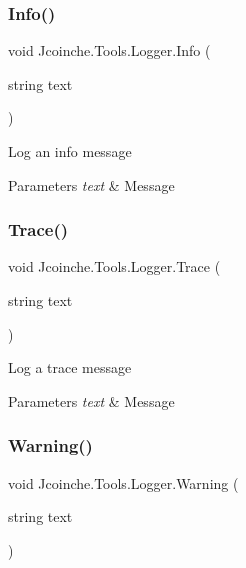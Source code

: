 \subsubsection{\texorpdfstring{Info()}{Info()}}
{\footnotesize\ttfamily void Jcoinche.\+Tools.\+Logger.\+Info (\begin{DoxyParamCaption}\item[{string}]{text }\end{DoxyParamCaption})\hspace{0.3cm}{\ttfamily [inline]}}



Log an info message 


\begin{DoxyParams}{Parameters}
{\em text} & Message\\
\hline
\end{DoxyParams}
\mbox{\label{class_jcoinche_1_1_tools_1_1_logger_ad1bdc8392d0df9cb110667feed0ef6a0}} 
\subsubsection{\texorpdfstring{Trace()}{Trace()}}
{\footnotesize\ttfamily void Jcoinche.\+Tools.\+Logger.\+Trace (\begin{DoxyParamCaption}\item[{string}]{text }\end{DoxyParamCaption})\hspace{0.3cm}{\ttfamily [inline]}}



Log a trace message 


\begin{DoxyParams}{Parameters}
{\em text} & Message\\
\hline
\end{DoxyParams}
\mbox{\label{class_jcoinche_1_1_tools_1_1_logger_a33394a0a861c3b7ef6288112f53a06c8}} 
\subsubsection{\texorpdfstring{Warning()}{Warning()}}
{\footnotesize\ttfamily void Jcoinche.\+Tools.\+Logger.\+Warning (\begin{DoxyParamCaption}\item[{string}]{text }\end{DoxyParamCaption})\hspace{0.3cm}{\ttfamily [inline]}}



